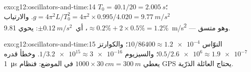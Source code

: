 \begin{solution}{exo:g12:oscillators-and-time:14}
$T_0 = 40.1/20 = \qty{2.005}{s}$؛ $g = 4\pi^2 L/T_0^2 = 4\pi^2
\times 0.995/4.020 = \qty{9.77}{m/s^2}$. والارتياب $\approx 0.2\%
+ 2 \times 0.5\% = 1.2\%$، أي\ $\pm\qty{0.12}{m/s^2}$: 
يحوي \qty{9.81}{m/s^2} --- وهو متسق.
\end{solution}

\begin{solution}{exo:g12:oscillators-and-time:15}
النوّاس $10/86400 \approx \num{1.2e-4}$؛ والكوارتز $0.5/\num{2.6e6}
\approx \num{1.9e-7}$؛ والسيزيوم $1/\num{3.2e15} \approx \num{3e-16}$.
وخطأ قدره \qty{1}{\micro s} يعطي $\num{1000} \times \qty{30}{cm} =
\qty{300}{m}$ في الموضع: فنظام GPS يحتاج العائلة الذرّية.
\end{solution}

